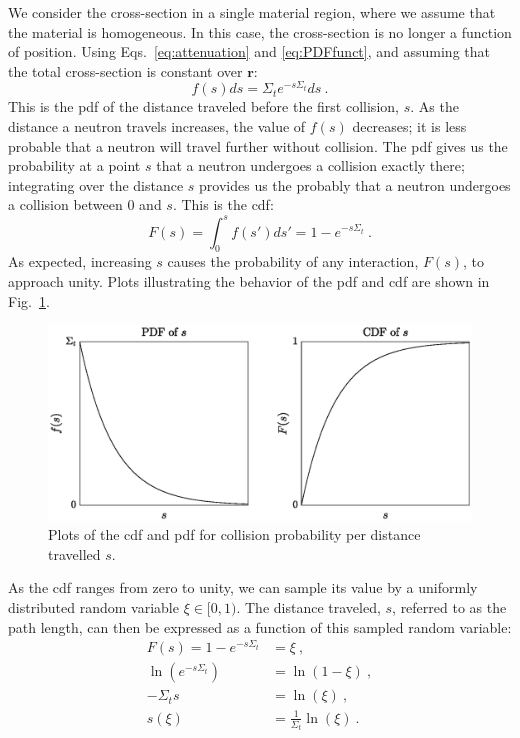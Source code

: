 We consider the cross-section in a single material region, where we
assume that the material is homogeneous. In this case, the
cross-section is no longer a function of position.  Using
Eqs.~\eqref{eq:attenuation} and \eqref{eq:PDFfunct}, and assuming that
the total cross-section is constant over $\mathbf{r}$\cite{lux1991}:
\begin{equation}
  \label{eq:PDF}
  f(s)ds = \Sigma_te^{-s\Sigma_t}ds\:.
\end{equation}
This is the \gls{pdf} of the distance
traveled before the first collision, $s$. As the distance a neutron travels
increases, the value of $f(s)$ decreases; it is less probable that a
neutron will travel further without collision. The \gls{pdf} gives us the
probability at a point $s$ that a neutron undergoes a collision
exactly there; integrating over the distance $s$ provides us the
probably that a neutron undergoes a collision between 0 and $s$. This
is the \gls{cdf}:
\begin{equation}
  \label{eq:cdf}
  F(s) = \int_0^s f(s')ds' = 1-e^{-s\Sigma_t}\:.
\end{equation}
As expected, increasing $s$ causes the probability of any interaction,
$F(s)$, to approach unity. Plots illustrating the behavior of the
\gls{pdf} and \gls{cdf} are shown in Fig.~\ref{fig:cdf_pdf}.
\begin{figure}[hbt]
  \centering
  \includegraphics[scale=0.75]{images/cdf_pdf}
  \caption{Plots of the \acrshort{cdf} and \acrshort{pdf} for collision probability per distance travelled $s$.}
  \label{fig:cdf_pdf}
\end{figure}

As the \gls{cdf} ranges from zero to unity, we can sample its value by
a uniformly distributed random variable $\xi \in [0,1)$. The distance
traveled, $s$, referred to as the path length, can then be expressed as
a function of this sampled random variable:
\begin{align*}
  F(s) = 1 - e^{-s\Sigma_t} &= \xi \:,\\
  \ln(e^{-s \Sigma_t}) &= \ln(1-\xi)\:, \\
  -\Sigma_t s &= \ln(\xi) \:,\\
  s(\xi) &= \frac{1}{\Sigma_t}\ln(\xi)\:.
\end{align*}

